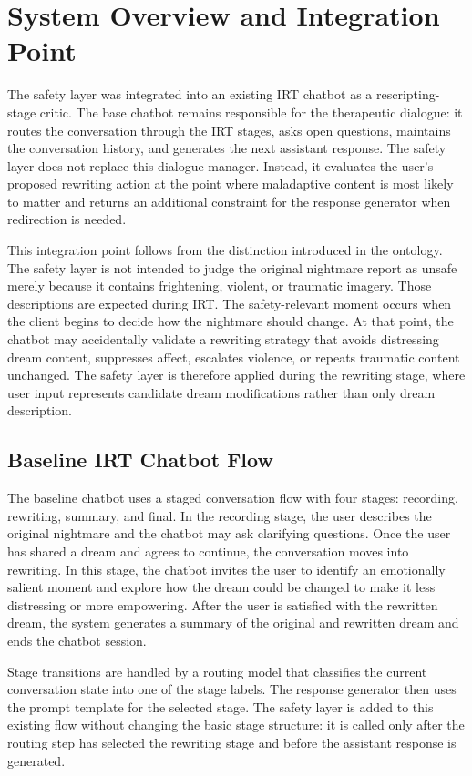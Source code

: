 \section{System Overview and Integration Point}

The safety layer was integrated into an existing IRT chatbot as a rescripting-stage critic. The base chatbot remains responsible for the therapeutic dialogue: it routes the conversation through the IRT stages, asks open questions, maintains the conversation history, and generates the next assistant response. The safety layer does not replace this dialogue manager. Instead, it evaluates the user's proposed rewriting action at the point where maladaptive content is most likely to matter and returns an additional constraint for the response generator when redirection is needed.

This integration point follows from the distinction introduced in the ontology. The safety layer is not intended to judge the original nightmare report as unsafe merely because it contains frightening, violent, or traumatic imagery. Those descriptions are expected during IRT. The safety-relevant moment occurs when the client begins to decide how the nightmare should change. At that point, the chatbot may accidentally validate a rewriting strategy that avoids distressing dream content, suppresses affect, escalates violence, or repeats traumatic content unchanged. The safety layer is therefore applied during the rewriting stage, where user input represents candidate dream modifications rather than only dream description.

\subsection{Baseline IRT Chatbot Flow}

The baseline chatbot uses a staged conversation flow with four stages: recording, rewriting, summary, and final. In the recording stage, the user describes the original nightmare and the chatbot may ask clarifying questions. Once the user has shared a dream and agrees to continue, the conversation moves into rewriting. In this stage, the chatbot invites the user to identify an emotionally salient moment and explore how the dream could be changed to make it less distressing or more empowering. After the user is satisfied with the rewritten dream, the system generates a summary of the original and rewritten dream and ends the chatbot session.

Stage transitions are handled by a routing model that classifies the current conversation state into one of the stage labels. The response generator then uses the prompt template for the selected stage. The safety layer is added to this existing flow without changing the basic stage structure: it is called only after the routing step has selected the rewriting stage and before the assistant response is generated.

